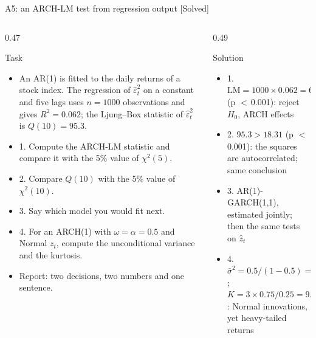 \begin{frame}{A5: an ARCH-LM test from regression output [Solved]}
\itemsize{\scriptsize}
\begin{columns}[T]
\begin{column}{0.47\textwidth}
\begin{block}{Task}
\begin{itemize}
    \item An AR(1) is fitted to the daily returns of a stock index. The regression of $\hat\varepsilon_t^2$ on a constant and five lags uses $n = 1000$ observations and gives $R^2 = 0.062$; the Ljung--Box statistic of $\hat\varepsilon_t^2$ is $Q(10) = 95.3$.
    \item 1. Compute the ARCH-LM statistic and compare it with the 5\% value of $\chi^2(5)$.
    \item 2. Compare $Q(10)$ with the 5\% value of $\chi^2(10)$.
    \item 3. Say which model you would fit next.
    \item 4. For an ARCH(1) with $\omega = \alpha = 0.5$ and Normal $z_t$, compute the unconditional variance and the kurtosis.
    \item Report: two decisions, two numbers and one sentence.
\end{itemize}
\end{block}
\end{column}
\begin{column}{0.49\textwidth}
\begin{exampleblock}{Solution}
\begin{itemize}
    \item 1. $\mathrm{LM} = 1000 \times 0.062 = 62.0 > 11.07$ (p $<$\,0.001): reject $H_0$, ARCH effects
    \item 2. $95.3 > 18.31$ (p $<$\,0.001): the squares are autocorrelated; same conclusion
    \item 3. AR(1)-GARCH(1,1), estimated jointly; then the same tests on $\hat z_t$
    \item 4. $\bar\sigma^2 = 0.5/(1 - 0.5) = 1.0$; $K = 3 \times 0.75/0.25 = 9.0$: Normal innovations, yet heavy-tailed returns
\end{itemize}
\end{exampleblock}
\end{column}
\end{columns}
\end{frame}

